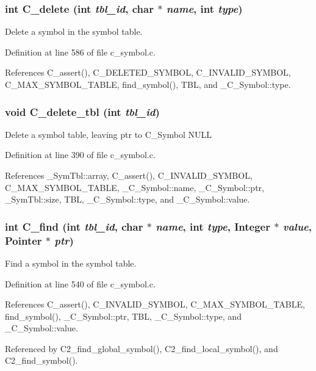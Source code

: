 \subsubsection{\setlength{\rightskip}{0pt plus 5cm}int C\_\-delete (int {\em tbl\_\-id}, char $\ast$ {\em name}, int {\em type})}\label{c__symbol_8c_65764557639df2713c9f127da4ffa222}


Delete a symbol in the symbol table. 

Definition at line 586 of file c\_\-symbol.c.

References C\_\-assert(), C\_\-DELETED\_\-SYMBOL, C\_\-INVALID\_\-SYMBOL, C\_\-MAX\_\-SYMBOL\_\-TABLE, find\_\-symbol(), TBL, and \_\-C\_\-Symbol::type.
\subsubsection{\setlength{\rightskip}{0pt plus 5cm}void C\_\-delete\_\-tbl (int {\em tbl\_\-id})}\label{c__symbol_8c_90b255ee5e4782d9fe4d241b3b5c4379}


Delete a symbol table, leaving ptr to C\_\-Symbol NULL 

Definition at line 390 of file c\_\-symbol.c.

References \_\-Sym\-Tbl::array, C\_\-assert(), C\_\-INVALID\_\-SYMBOL, C\_\-MAX\_\-SYMBOL\_\-TABLE, \_\-C\_\-Symbol::name, \_\-C\_\-Symbol::ptr, \_\-Sym\-Tbl::size, TBL, \_\-C\_\-Symbol::type, and \_\-C\_\-Symbol::value.
\subsubsection{\setlength{\rightskip}{0pt plus 5cm}int C\_\-find (int {\em tbl\_\-id}, char $\ast$ {\em name}, int {\em type}, \bf{Integer} $\ast$ {\em value}, \bf{Pointer} $\ast$ {\em ptr})}\label{c__symbol_8c_25fbe8c538d064e4a59ec2fb2598a1d5}


Find a symbol in the symbol table. 

Definition at line 540 of file c\_\-symbol.c.

References C\_\-assert(), C\_\-INVALID\_\-SYMBOL, C\_\-MAX\_\-SYMBOL\_\-TABLE, find\_\-symbol(), \_\-C\_\-Symbol::ptr, TBL, \_\-C\_\-Symbol::type, and \_\-C\_\-Symbol::value.

Referenced by C2\_\-find\_\-global\_\-symbol(), C2\_\-find\_\-local\_\-symbol(), and C2\_\-find\_\-symbol().
